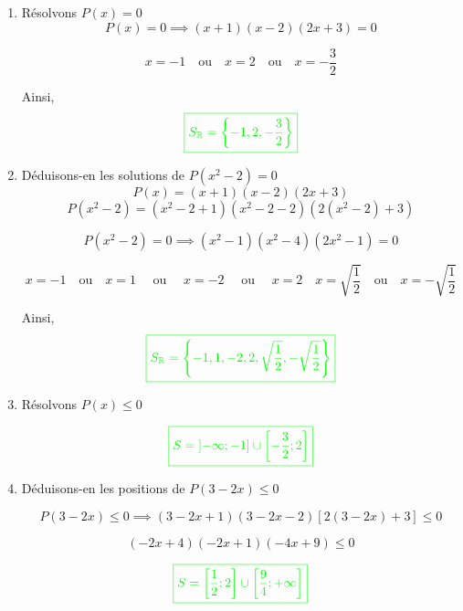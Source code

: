\documentclass[12pt,a4paper]{article}
\begin{document}
\begin{enumerate}
\item Résolvons \( P(x) = 0 \)
\[
P(x) = 0 \implies (x+1)(x-2)(2x+3) = 0
\]
  
\[
x = -1 \quad \text{ou} \quad x = 2 \quad \text{ou} \quad x = -\frac{3}{2}
\]

Ainsi,  
\[
\textcolor{green}{\boxed{S_{\mathbb{R}} = \left\{ -1, 2, -\frac{3}{2} \right\}}}
\]

\item Déduisons-en les solutions de \( P(x^2 - 2) = 0 \)
 \[ P(x) = (x+1)(x-2)(2x+3) \]
\[
P(x^2 - 2) = (x^2 - 2 + 1)(x^2 - 2 - 2)(2(x^2 - 2) + 3)
\]

\[
P(x^2 - 2) = 0 \implies (x^2 - 1)(x^2-4)(2x^2 - 1) = 0
\]
 
\[
x = -1 \quad \text{ou} \quad x = 1 \quad \text{ ou } \quad x=-2 \quad \text{ ou } \quad x=2\quad x = \sqrt{\frac{1}{2}} \quad \text{ou} \quad x = -\sqrt{\frac{1}{2}}
\]

Ainsi,  
\[
\textcolor{green}{\boxed{S_{\mathbb{R}} = \left\{ -1, 1, -2,2, \sqrt{\frac{1}{2}}, -\sqrt{\frac{1}{2}} \right\}}} 
\]

\item  Résolvons \( P(x) \leq 0 \)

\begin{center}
\end{center}
\[
\textcolor{green}{\boxed{S = \left] -\infty ; -1\right] \cup \left[ -\frac{3}{2};2\right] }} 
\]
\item Déduisons-en les positions de \( P(3-2x) \leq 0 \)

\[
P(3-2x) \leq 0 \implies 
\left( 3 - 2x + 1 \right)\left( 3 - 2x - 2 \right)\left[ 2\left( 3 - 2x \right) + 3 \right] \leq 0
\]

\[
\left( -2x + 4 \right)\left( -2x + 1 \right)\left( -4x + 9 \right) \leq 0
\]
\begin{center}
\end{center}
\[
\textcolor{green}{\boxed{S = \left[ \frac{1}{2} ; 2\right] \cup \left[ \frac{9}{4};+\infty\right] }} 
\]
\end{enumerate}
\end{document}
